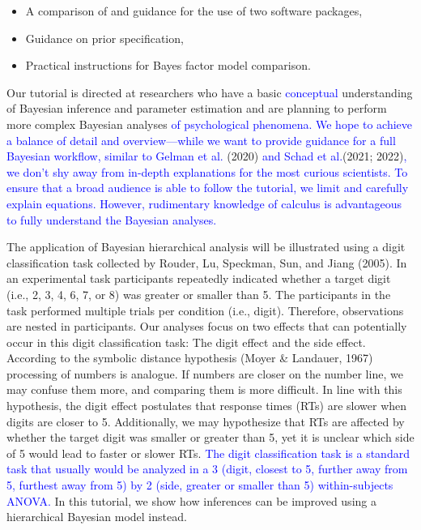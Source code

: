 \documentclass[
  english,
  doc,floatsintext]{apa6}
\providecommand{\tightlist}{%
  \setlength{\itemsep}{0pt}\setlength{\parskip}{0pt}}
\begin{document}
\begin{itemize}
\tightlist
\item
  A comparison of and guidance for the use of two software packages,
\item
  Guidance on prior specification,
\item
  Practical instructions for Bayes factor model comparison.
\end{itemize}

Our tutorial is directed at researchers who have a basic \textcolor{blue}{conceptual} understanding of Bayesian inference and parameter estimation and are planning to perform more complex Bayesian analyses \textcolor{blue}{of psychological phenomena. We hope to achieve a balance of detail and overview---while we want to provide guidance for a full Bayesian workflow, similar to Gelman et al.} (2020) \textcolor{blue}{and Schad et al.}(2021; 2022)\textcolor{blue}{, we don't shy away from in-depth explanations for the most curious scientists. To ensure that a broad audience is able to follow the tutorial, we limit and carefully explain equations. However, rudimentary knowledge of calculus is advantageous to fully understand the Bayesian analyses. }

The application of Bayesian hierarchical analysis will be illustrated using a digit classification task collected by Rouder, Lu, Speckman, Sun, and Jiang (2005). In an experimental task participants repeatedly indicated whether a target digit (i.e., 2, 3, 4, 6, 7, or 8) was greater or smaller than 5. The participants in the task performed multiple trials per condition (i.e., digit). Therefore, observations are nested in participants. Our analyses focus on two effects that can potentially occur in this digit classification task: The digit effect and the side effect. According to the symbolic distance hypothesis (Moyer \& Landauer, 1967) processing of numbers is analogue. If numbers are closer on the number line, we may confuse them more, and comparing them is more difficult. In line with this hypothesis, the digit effect postulates that response times (RTs) are slower when digits are closer to 5. Additionally, we may hypothesize that RTs are affected by whether the target digit was smaller or greater than 5, yet it is unclear which side of 5 would lead to faster or slower RTs. \textcolor{blue}{The digit classification task is a standard task that usually would be analyzed in a 3 (digit, closest to 5, further away from 5, furthest away from 5) by 2 (side, greater or smaller than 5) within-subjects ANOVA.} In this tutorial, we show how inferences can be improved using a hierarchical Bayesian model instead.
\end{document}

